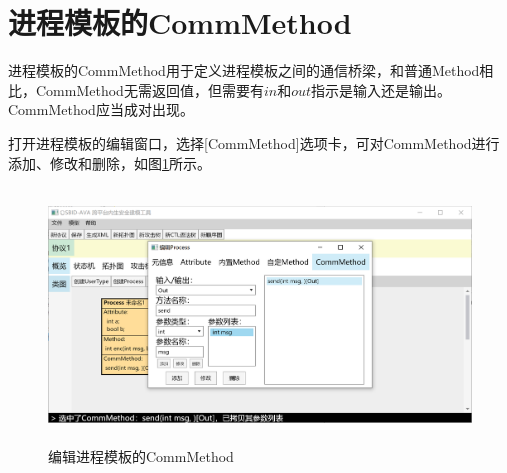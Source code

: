 \section{进程模板的CommMethod}
进程模板的CommMethod用于定义进程模板之间的通信桥梁，和普通Method相比，CommMethod无需返回值，但需要有$in$和$out$指示是输入还是输出。CommMethod应当成对出现。
\par
打开进程模板的编辑窗口，选择[CommMethod]选项卡，可对CommMethod进行添加、修改和删除，如图\ref{process_edit_commmethod}所示。
\begin{figure}[h]
	\centering
	\includegraphics[width=12cm,height=6.75cm]{imgs/process_edit_commmethod.png}
	\caption{编辑进程模板的CommMethod}
	\label{process_edit_commmethod}
\end{figure}


